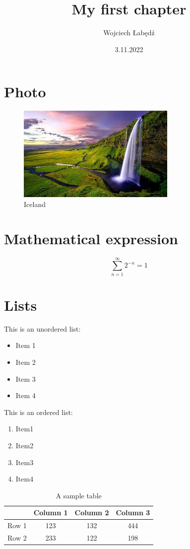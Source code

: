 \documentclass{article}
\title{My first chapter}
\author{Wojciech Łabędź}
\date{3.11.2022}
\begin{document}
\maketitle
\section{Photo}
\begin{center}
\begin{figure}[h!]
  \includegraphics[scale=1.2]{Pictures/iceland.jpg}
  \caption{Iceland}
  \label{iceland_figure}
\end{figure}
\end{center}
\section{Mathematical expression}

\[\sum_{n=1}^{\infty} 2^{-n} =1\]
\pagebreak

\section{Lists}

This is an unordered list:
\begin{itemize}
    \item Item 1
    \item Item 2
    \item Item 3
    \item Item 4
\end{itemize}

This is an ordered list:
\begin{enumerate}
    \item Item1
    \item Item2
    \item Item3
    \item Item4
\end{enumerate}

\begin{table}[]
\begin{tabular}{c|c|c|c|}
\cline{2-4}
\multicolumn{1}{l|}{}                        & \cellcolor[HTML]{9698ED}Column 1 & \cellcolor[HTML]{9698ED}Column 2 & \cellcolor[HTML]{9698ED}Column 3 \\ \hline
\multicolumn{1}{|c|}{\cellcolor[HTML]{9698ED}Row 1} & 123 & 132 & 444 \\ \hline
\multicolumn{1}{|c|}{\cellcolor[HTML]{9698ED}Row 2} & 233 & 122 & 198 \\ \hline
\end{tabular}
\caption{A sample table}
\label{table_1}
\end{table}
\end{document}
